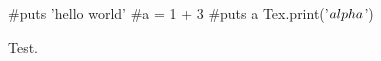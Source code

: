 \documentclass{article}
\begin{document}
\begin{rbtex}
#puts 'hello world'
#a = 1 + 3
#puts a
Tex.print('$\\alpha$')
\end{rbtex}
Test.
\end{document}
